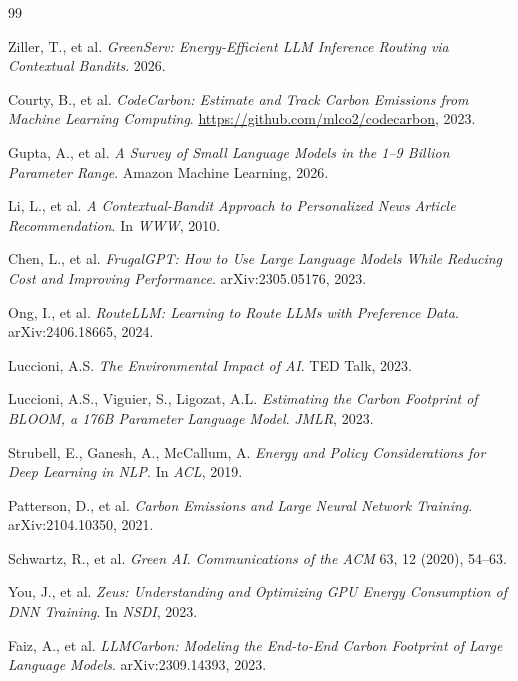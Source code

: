 \documentclass[12pt]{article}
\begin{document}
\begin{thebibliography}{99}

Ziller, T., et al.
\textit{GreenServ: Energy-Efficient LLM Inference Routing via Contextual Bandits}.
2026.

Courty, B., et al.
\textit{CodeCarbon: Estimate and Track Carbon Emissions from Machine Learning Computing}.
\url{https://github.com/mlco2/codecarbon}, 2023.

Gupta, A., et al.
\textit{A Survey of Small Language Models in the 1--9 Billion Parameter Range}.
Amazon Machine Learning, 2026.

Li, L., et al.
\textit{A Contextual-Bandit Approach to Personalized News Article Recommendation}.
In \textit{WWW}, 2010.

Chen, L., et al.
\textit{FrugalGPT: How to Use Large Language Models While Reducing Cost and Improving Performance}.
arXiv:2305.05176, 2023.

Ong, I., et al.
\textit{RouteLLM: Learning to Route LLMs with Preference Data}.
arXiv:2406.18665, 2024.

Luccioni, A.S.
\textit{The Environmental Impact of AI}.
TED Talk, 2023.

Luccioni, A.S., Viguier, S., Ligozat, A.L.
\textit{Estimating the Carbon Footprint of BLOOM, a 176B Parameter Language Model}.
\textit{JMLR}, 2023.

Strubell, E., Ganesh, A., McCallum, A.
\textit{Energy and Policy Considerations for Deep Learning in NLP}.
In \textit{ACL}, 2019.

Patterson, D., et al.
\textit{Carbon Emissions and Large Neural Network Training}.
arXiv:2104.10350, 2021.

Schwartz, R., et al.
\textit{Green AI}.
\textit{Communications of the ACM} 63, 12 (2020), 54--63.

You, J., et al.
\textit{Zeus: Understanding and Optimizing GPU Energy Consumption of DNN Training}.
In \textit{NSDI}, 2023.

Faiz, A., et al.
\textit{LLMCarbon: Modeling the End-to-End Carbon Footprint of Large Language Models}.
arXiv:2309.14393, 2023.

\end{thebibliography}
\end{document}
